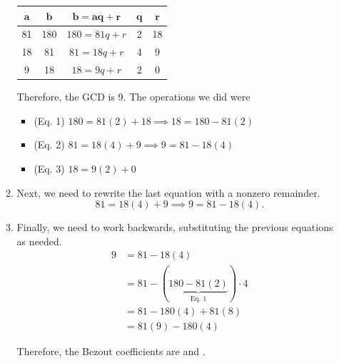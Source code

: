 \documentclass[letterpaper]{article}
\begin{document}
\begin{mdframed}
\begin{itemize}
\begin{mdframed}
\begin{enumerate}
                \begin{center}
                    \begin{tabular}{|c|c|c|c|c|}
                        \hline 
                        $\mathbf{a}$ & $\mathbf{b}$ & $\mathbf{b = aq + r}$ & $\mathbf{q}$ & $\mathbf{r}$ \\ 
                        \hline 
                        81 & 180 & $180 = 81q + r$ & 2 & 18 \\ 
                        18 & 81 & $81 = 18q + r$ & 4 & 9 \\ 
                        9 & 18 & $18 = 9q + r$ & 2 & 0 \\ 
                        \hline 
                    \end{tabular}
                \end{center}
                Therefore, the GCD is 9. The operations we did were 
                \begin{itemize}
                    \item (Eq. 1) $180 = 81(2) + 18 \implies 18 = 180 - 81(2)$
                    \item (Eq. 2) $81 = 18(4) + 9 \implies 9 = 81 - 18(4)$ 
                    \item (Eq. 3) $18 = 9(2) + 0$
                \end{itemize}
        


                \item Next, we need to rewrite the last equation with a nonzero remainder. 
                \[81 = 18(4) + 9 \implies 9 = 81 - 18(4).\]

                \item Finally, we need to work backwards, substituting the previous equations as needed. 
                \begin{equation*}
                    \begin{aligned}
                        9 &= 81 - 18(4) \\ 
                            &= 81 - (\underbrace{180 - 81(2)}_{\text{Eq. 1}}) \cdot 4 \\ 
                            &= 81 - 180(4) + 81(8) \\ 
                            &= 81(9) - 180(4) 
                    \end{aligned}
                \end{equation*}

                Therefore, the Bezout coefficients are  and .
            \end{enumerate}




\end{mdframed}
\end{itemize}
\end{mdframed}
\end{document}
